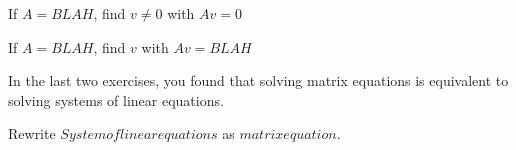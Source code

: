 \documentclass{article}
\begin{document}
\begin{question}
  If $A = BLAH$, find $v \neq 0$ with $Av = 0$ 
\end{question}
	
\begin{question}
  If $A = BLAH$, find $v$ with $Av = BLAH$ 
\end{question}
	
In the last two exercises, you found that solving matrix equations is equivalent to solving systems of linear equations.

\begin{question}
  Rewrite  $System of linear equations$ as $matrix equation$.
\end{question}
\end{document}

